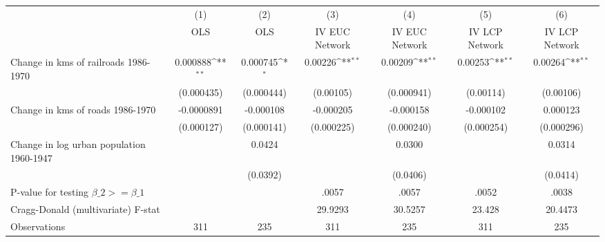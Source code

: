 {
\def\sym#1{\ifmmode^{#1}\else\(^{#1}\)\fi}
\begin{tabular}{l*{6}{c}}
\hline\hline
                &\multicolumn{1}{c}{(1)}&\multicolumn{1}{c}{(2)}&\multicolumn{1}{c}{(3)}&\multicolumn{1}{c}{(4)}&\multicolumn{1}{c}{(5)}&\multicolumn{1}{c}{(6)}\\
                &\multicolumn{1}{c}{OLS}&\multicolumn{1}{c}{OLS}&\multicolumn{1}{c}{IV EUC Network}&\multicolumn{1}{c}{IV EUC Network}&\multicolumn{1}{c}{IV LCP Network}&\multicolumn{1}{c}{IV LCP Network}\\
\hline
Change in kms of railroads 1986-1970& 0.000888\sym{**} & 0.000745\sym{*}  &  0.00226\sym{**} &  0.00209\sym{**} &  0.00253\sym{**} &  0.00264\sym{**} \\
                &(0.000435)         &(0.000444)         &(0.00105)         &(0.000941)         &(0.00114)         &(0.00106)         \\
[1em]
Change in kms of roads 1986-1970&-0.0000891         &-0.000108         &-0.000205         &-0.000158         &-0.000102         & 0.000123         \\
                &(0.000127)         &(0.000141)         &(0.000225)         &(0.000240)         &(0.000254)         &(0.000296)         \\
[1em]
Change in log urban population 1960-1947&                  &   0.0424         &                  &   0.0300         &                  &   0.0314         \\
                &                  & (0.0392)         &                  & (0.0406)         &                  & (0.0414)         \\
\hline
P-value for testing $\beta\_{2} >= \beta\_{1}$&                  &                  &    .0057         &    .0057         &    .0052         &    .0038         \\
Cragg-Donald (multivariate) F-stat&                  &                  &  29.9293         &  30.5257         &   23.428         &  20.4473         \\
Observations    &      311         &      235         &      311         &      235         &      311         &      235         \\
\hline\hline
\end{tabular}
}
